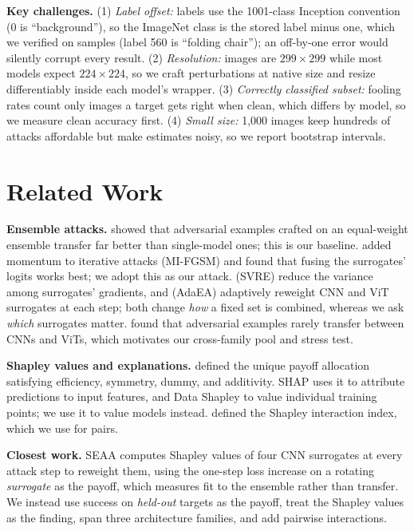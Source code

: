 \documentclass{article}
\begin{document}
\textbf{Key challenges.} (1) \emph{Label offset:} labels use the 1001-class Inception convention (0 is ``background''), so the ImageNet class is the stored label minus one, which we verified on samples (label 560 is ``folding chair''); an off-by-one error would silently corrupt every result. (2) \emph{Resolution:} images are $299\times299$ while most models expect $224\times224$, so we craft perturbations at native size and resize differentiably inside each model's wrapper. (3) \emph{Correctly classified subset:} fooling rates count only images a target gets right when clean, which differs by model, so we measure clean accuracy first. (4) \emph{Small size:} 1,000 images keep hundreds of attacks affordable but make estimates noisy, so we report bootstrap intervals.

\section{Related Work}

\textbf{Ensemble attacks.} \citet{liu2017delving} showed that adversarial examples crafted on an equal-weight ensemble transfer far better than single-model ones; this is our baseline. \citet{dong2018boosting} added momentum to iterative attacks (MI-FGSM) and found that fusing the surrogates' logits works best; we adopt this as our attack. \citet{xiong2022svre} (SVRE) reduce the variance among surrogates' gradients, and \citet{chen2023adaea} (AdaEA) adaptively reweight CNN and ViT surrogates at each step; both change \emph{how} a fixed set is combined, whereas we ask \emph{which} surrogates matter. \citet{mahmood2021robustness} found that adversarial examples rarely transfer between CNNs and ViTs, which motivates our cross-family pool and stress test.

\textbf{Shapley values and explanations.} \citet{shapley1953value} defined the unique payoff allocation satisfying efficiency, symmetry, dummy, and additivity. SHAP \citep{lundberg2017unified} uses it to attribute predictions to input features, and Data Shapley \citep{ghorbani2019data} to value individual training points; we use it to value models instead. \citet{grabisch1999axiomatic} defined the Shapley interaction index, which we use for pairs.

\textbf{Closest work.} SEAA \citep{wang2024seaa} computes Shapley values of four CNN surrogates at every attack step to reweight them, using the one-step loss increase on a rotating \emph{surrogate} as the payoff, which measures fit to the ensemble rather than transfer. We instead use success on \emph{held-out} targets as the payoff, treat the Shapley values as the finding, span three architecture families, and add pairwise interactions.
\end{document}
